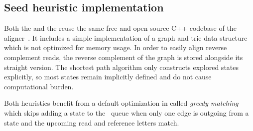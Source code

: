 \subsection{Seed heuristic implementation}

Both the \seedh and the \prefixh reuse the same free and open source C++
codebase of the \astarix aligner~\citep{ivanov2020astarix}. It includes a simple
implementation of a graph and trie data structure which is not optimized for
memory usage. In order to easily align reverse complement reads, the reverse
complement of the graph is stored alongside its straight version. The shortest
path algorithm only constructs explored states explicitly, so most states remain
implicitly defined and do not cause computational burden.

Both heuristics benefit from a default optimization in \astarix called
\emph{greedy matching}~\citep[Section 4.2]{ivanov2020astarix} which skips
adding a state to the \A~queue when only one edge is outgoing from a state and
the upcoming read and reference letters match.